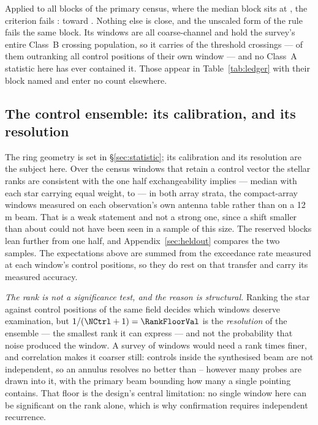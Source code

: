 Applied to all \BqNBlocks{} blocks of the primary census, where the median
block sits at \BqQMed, the criterion fails \BqNFail: \BqFailBlock{} toward
\BqFailStar. Nothing else is close, and the unscaled form of the rule fails
the same \BqRawNFail{} block. Its \BqFailNWin{} windows are all coarse-channel and
hold the survey's entire Class~B crossing population, so it carries
\EvNCrossFlag{} of the \EvNCrossRaw{} threshold crossings --- \EvNRankFlag{}
of them outranking all \NCtrl{} control positions of their own window --- and
no Class~A statistic here has ever contained it. Those \EvNCrossFlag{} appear
in Table~\ref{tab:ledger} with their block named and enter no count
elsewhere.

\subsection{The control ensemble: its calibration, and its resolution}

The ring geometry is set in \S\ref{sec:statistic}; its calibration and its
resolution are the subject here. Over the \VerNTested{} census windows that
retain a control vector the stellar ranks are consistent with the one half
exchangeability implies --- median \BkRankBalSurv{} with each star carrying
equal weight, \BkRankBalSurvLo{} to \BkRankBalSurvHi{} --- in both array
strata, the compact-array windows measured on each observation's own antenna
table rather than on a 12\,m beam. That is a weak statement and not a strong
one, since a shift smaller than about \VerKsPowerAca{} could not have been
seen in a sample of this size. The reserved blocks lean further from one
half, and Appendix~\ref{sec:heldout} compares the two samples. The
expectations above are summed from the exceedance rate measured at each
window's control positions, so they do rest on that transfer and carry its
measured accuracy.

\emph{The rank is not a significance test, and the reason is structural.}
Ranking the star against \NCtrl{} control positions of the same field
decides which windows deserve examination, but $1/(\NCtrl+1)=\RankFloorVal$
is the \emph{resolution} of the ensemble --- the smallest rank it can
express --- and not the probability that noise produced the window. A survey
of \NWindows{} windows would need a rank \BonfRankRatio{} times finer, and
correlation makes it coarser still: controls inside the synthesised beam are
not independent, so an annulus resolves no better than
\RankEffLo--\RankEffHi{} however many probes are drawn into it, with the
primary beam bounding how many a single pointing contains. That floor is the
design's central limitation: no single window here can be significant on the
rank alone, which is why confirmation requires independent recurrence.

